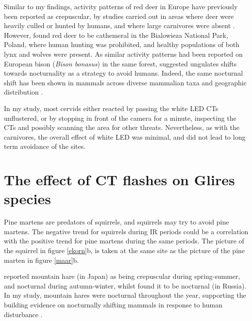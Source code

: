Similar to my findings, activity patterns of red deer in Europe have previously been reported as crepuscular, by studies carried out in areas where deer were heavily culled or hunted by humans, and where large carnivores were absent \autocite{Kamler2007}. 
However, \textcite{Kamler2007} found red deer to be cathemeral in the Bialowieza National Park, Poland, where human hunting was prohibited, and healthy populations of both lynx and wolves were present.
As similar activity patterns had been reported on European bison (\textit{Bison bonasus}) in the same forest, \textcite{Kamler2007} suggested ungulates shifts towards nocturnality as a strategy to avoid humans. 
Indeed, the same nocturnal shift has been shown in mammals across diverse mammalian taxa and geographic distribution \autocite{Gaynor2018}.

In my study, most cervids either reacted by passing the white LED CTs unflustered, or by stopping in front of the camera for a minute, inspecting the CTs and possibly scanning the area for other threats. 
Nevertheless, as with the carnivores, the overall effect of white LED was minimal, and did not lead to long term avoidance of the sites. 



\section{The effect of CT flashes on Glires species}



Pine martens are predators of squirrels, and squirrels may try to avoid pine martens.
The negative trend for squirrels during IR periods could be a correlation with the positive trend for pine martens during the same periods.
The picture of the squirrel in figure \ref{ekorn}b, is taken at the same site as the picture of the pine marten in figure \ref{maar}b.



\textcite{Ikeda2016} reported mountain hare (in Japan) as being crepuscular during spring-summer, and nocturnal during autumn-winter, whilst \textcite{Ogurtsov2018} found it to be nocturnal (in Russia). In my study, mountain hares were nocturnal throughout the year, supporting the building evidence on nocturnally shifting mammals in response to human disturbance \autocite{Gaynor2018}. 

